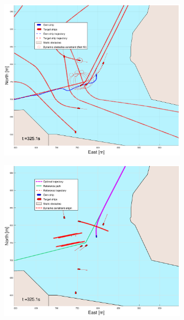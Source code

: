 \begin{figure}[ht!]
\begin{subfigure}[b]{0.499\textwidth}
    \end{subfigure}
    \hfill
    \\
    \begin{subfigure}[b]{0.49\textwidth}
        \centering
        \includegraphics[width=\textwidth]{Images/Figures/Trheimfjord/_Simple_0fig1_time=325}
    \end{subfigure}
    \hfill
    \begin{subfigure}[b]{0.499\textwidth}
        \centering
        \includegraphics[width=\textwidth]{Images/Figures/Trheimfjord/_Simple_0fig999_time=325}

\end{subfigure}
\end{figure}
